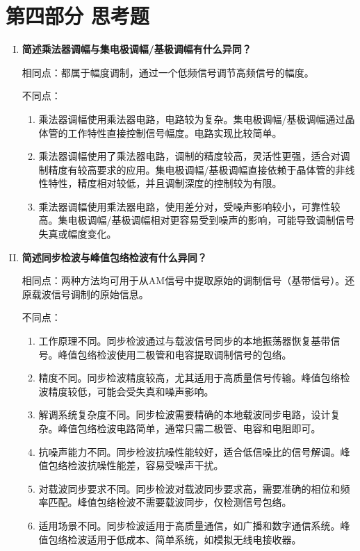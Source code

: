 \documentclass[UTF8]{ctexart}
\begin{document}
\section{第四部分 \texorpdfstring{\quad}{} 思考题}
\begin{enumerate}[I.]

    \item \textbf{简述乘法器调幅与集电极调幅/基极调幅有什么异同？}
    
    相同点：都属于幅度调制，通过一个低频信号调节高频信号的幅度。
    
    不同点：
    \begin{enumerate}[(1)]
        \item 乘法器调幅使用乘法器电路，电路较为复杂。集电极调幅/基极调幅通过晶体管的工作特性直接控制信号幅度。电路实现比较简单。
        \item 乘法器调幅使用了乘法器电路，调制的精度较高，灵活性更强，适合对调制精度有较高要求的应用。集电极调幅/基极调幅直接依赖于晶体管的非线性特性，精度相对较低，并且调制深度的控制较为有限。
        \item 乘法器调幅使用乘法器电路，使用差分对，受噪声影响较小，可靠性较高。集电极调幅/基极调幅相对更容易受到噪声的影响，可能导致调制信号失真或幅度变化。
    \end{enumerate}
    
    \item \textbf{简述同步检波与峰值包络检波有什么异同？}
    
    相同点：两种方法均可用于从AM信号中提取原始的调制信号（基带信号）。还原载波信号调制的原始信息。

    不同点：
    \begin{enumerate}[(1)]
    \item 工作原理不同。同步检波通过与载波信号同步的本地振荡器恢复基带信号。峰值包络检波使用二极管和电容提取调制信号的包络。
    
    \item 精度不同。同步检波精度较高，尤其适用于高质量信号传输。峰值包络检波精度较低，可能会受失真和噪声影响。
    
    \item 解调系统复杂度不同。同步检波需要精确的本地载波同步电路，设计复杂。峰值包络检波电路简单，通常只需二极管、电容和电阻即可。
    
    \item 抗噪声能力不同。同步检波抗噪性能较好，适合低信噪比的信号解调。峰值包络检波抗噪性能差，容易受噪声干扰。
    
    \item 对载波同步要求不同。同步检波对载波同步要求高，需要准确的相位和频率匹配。峰值包络检波不需要载波同步，仅检测信号包络。
    
    \item 适用场景不同。同步检波适用于高质量通信，如广播和数字通信系统。峰值包络检波适用于低成本、简单系统，如模拟无线电接收器。
    \end{enumerate}

    

\end{enumerate}
\end{document}
